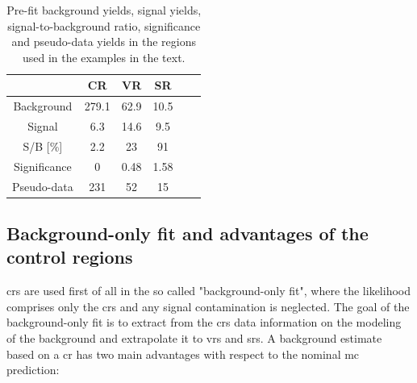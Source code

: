 \begin{table}
\centering
\begin{tabular}{|c|c|c|c|c|c|}
\hline 
 & CR & VR & SR  \\ 
\hline 
Background & 279.1 & 62.9 & 10.5  \\ 
\hline 
Signal & 6.3 & 14.6 & 9.5 \\ 
\hline 
S/B [\%] & 2.2 & 23 & 91 \\ 
\hline 
Significance & 0 & 0.48 & 1.58 \\ 
\hline 
Pseudo-data & 231 & 52 & 15 \\ 
\hline 
\end{tabular} 
\caption{Pre-fit background yields, signal yields, signal-to-background ratio, significance and pseudo-data yields in the regions used in the examples in the text.}
\label{tab:stat:exampleyeilds}
\end{table}

\subsection{Background-only fit and advantages of the control regions}
\label{sec:example_cr}

\glspl{cr} are used first of all in the so called "background-only fit", where the likelihood comprises only the \glspl{cr} and any signal contamination is neglected. The goal of the background-only fit is to extract from the \glspl{cr} data information on the modeling of the background 
and extrapolate it to \glspl{vr} and \glspl{sr}. A background estimate based on a \gls{cr} has two main advantages with respect to the nominal \gls{mc} prediction:

